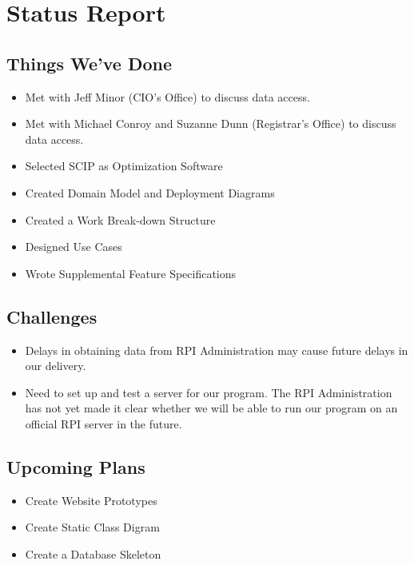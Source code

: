 \documentclass[11pt]{article}
\begin{document}
\section{Status Report}

\subsection{Things We've Done}
\begin{itemize}
\item Met with Jeff Minor (CIO's Office) to discuss data access.
\item Met with Michael Conroy and Suzanne Dunn (Registrar's Office) to discuss data access.
\item Selected SCIP as Optimization Software
\item Created Domain Model and Deployment Diagrams
\item Created a Work Break-down Structure
\item Designed Use Cases
\item Wrote Supplemental Feature Specifications

\end{itemize}

\subsection{Challenges}
\begin{itemize}
\item Delays in obtaining data from RPI Administration may cause future delays in our delivery.
\item Need to set up and test a server for our program. The RPI Administration has not yet made it clear whether we will be able to run our program on an official RPI server in the future.
\end{itemize}

\subsection{Upcoming Plans}
\begin{itemize}
\item Create Website Prototypes
\item Create Static Class Digram
\item Create a Database Skeleton
\end{itemize}
\end{document}
